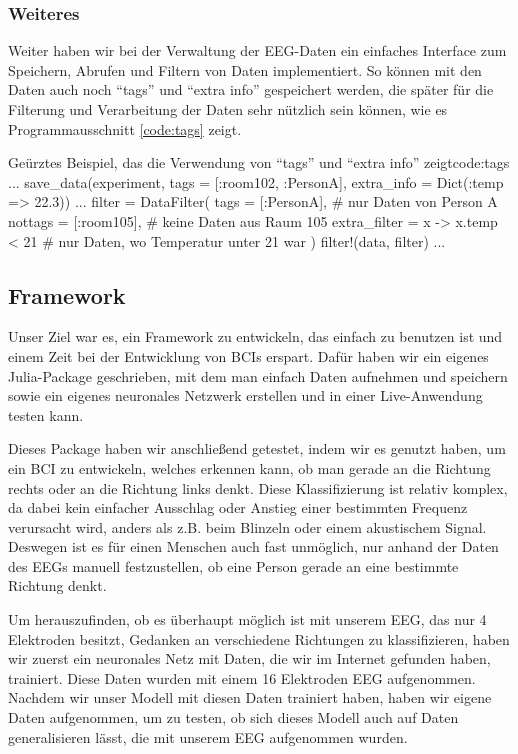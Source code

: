 \documentclass[10pt]{article}
\newcommand{\coderef}[1]{Programmausschnitt \ref{#1}}
\begin{document}
\subsubsection{Weiteres}

Weiter haben wir bei der Verwaltung der EEG-Daten ein einfaches Interface zum Speichern, Abrufen und Filtern von Daten implementiert.
So können mit den Daten auch noch \enquote{tags} und \enquote{extra info} gespeichert werden, die später für die Filterung und Verarbeitung der Daten sehr nützlich sein können, wie es \coderef{code:tags} zeigt.


\begin{code}{Geürztes Beispiel, das die Verwendung von \enquote{tags} und \enquote{extra info} zeigt}{code:tags}
...
save_data(experiment, tags = [:room102, :PersonA], 
    extra_info = Dict(:temp => 22.3))
...
filter = DataFilter(
    tags = [:PersonA], # nur Daten von Person A
    nottags = [:room105], # keine Daten aus Raum 105
    extra_filter = x -> x.temp < 21 # nur Daten, wo Temperatur unter 21 war
)
filter!(data, filter)
...
\end{code}
\subsection{Framework}

Unser Ziel war es, ein Framework zu entwickeln, das einfach zu benutzen ist und einem Zeit bei der Entwicklung von BCIs erspart. Dafür haben wir ein eigenes Julia-Package geschrieben, mit dem man einfach Daten aufnehmen und speichern sowie ein eigenes neuronales Netzwerk erstellen und in einer Live-Anwendung testen kann.

Dieses Package haben wir anschließend getestet, indem wir es genutzt haben, um ein BCI zu entwickeln, welches erkennen kann, ob man gerade an die Richtung rechts oder an die Richtung links denkt. Diese Klassifizierung ist relativ komplex, da dabei kein einfacher Ausschlag oder Anstieg einer bestimmten Frequenz verursacht wird, anders als z.B. beim Blinzeln oder einem akustischem Signal. Deswegen ist es für einen Menschen auch fast unmöglich, nur anhand der Daten des EEGs manuell festzustellen, ob eine Person gerade an eine bestimmte Richtung denkt.

Um herauszufinden, ob es überhaupt möglich ist mit unserem EEG, das nur 4 Elektroden besitzt, Gedanken an verschiedene Richtungen zu klassifizieren, haben wir zuerst ein neuronales Netz mit Daten, die wir im Internet gefunden haben, trainiert. Diese Daten wurden mit einem 16 Elektroden EEG aufgenommen. Nachdem wir unser Modell mit diesen Daten trainiert haben, haben wir eigene Daten aufgenommen, um zu testen, ob sich dieses Modell auch auf Daten generalisieren lässt, die mit unserem EEG aufgenommen wurden.
\end{document}
